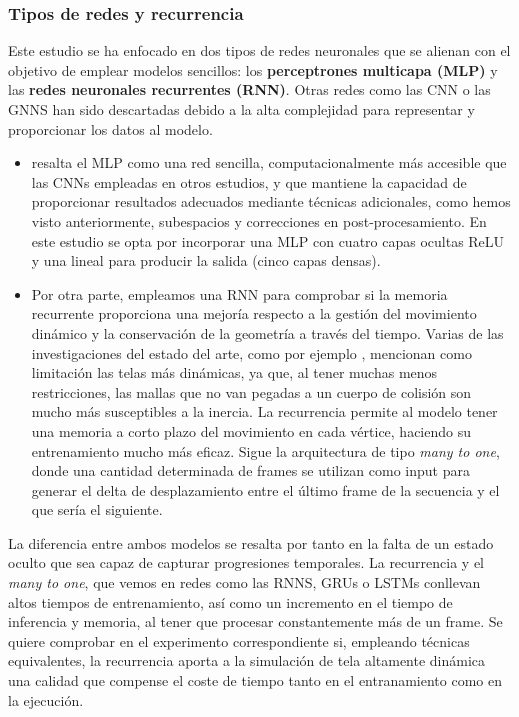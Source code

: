 \subsubsection{Tipos de redes y recurrencia}
Este estudio se ha enfocado en dos tipos de redes neuronales que se alienan con el objetivo de emplear modelos sencillos: los \textbf{perceptrones multicapa (MLP)} y las \textbf{redes neuronales recurrentes (RNN)}. Otras redes como las CNN o las GNNS han sido descartadas debido a la alta complejidad para representar y proporcionar los datos al modelo. 

\begin{itemize}
    \item \cite{holden_subspace_2019} resalta el MLP como una red sencilla, computacionalmente más accesible que las CNNs empleadas en otros estudios, y que mantiene la capacidad de proporcionar resultados adecuados mediante técnicas adicionales, como hemos visto anteriormente, subespacios y correcciones en post-procesamiento. En este estudio se opta por incorporar una MLP con cuatro capas ocultas ReLU y una lineal para producir la salida (cinco capas densas). %
    
    \item Por otra parte, empleamos una RNN para comprobar si la memoria recurrente proporciona una mejoría respecto a la gestión del movimiento dinámico y la conservación de la geometría a través del tiempo. Varias de las investigaciones del estado del arte, como por ejemplo \cite{santesteban2022snug}, mencionan como limitación las telas más dinámicas, ya que, al tener muchas menos restricciones, las mallas que no van pegadas a un cuerpo de colisión son mucho más susceptibles a la inercia. La recurrencia permite al modelo tener una memoria a corto plazo del movimiento en cada vértice, haciendo su entrenamiento mucho más eficaz. Sigue la arquitectura de tipo \textit{many to one}, donde una cantidad determinada de frames se utilizan como input para generar el delta de desplazamiento entre el último frame de la secuencia y el que sería el siguiente.
\end{itemize}

La diferencia entre ambos modelos se resalta por tanto en la falta de un estado oculto que sea capaz de capturar progresiones temporales. La recurrencia y el \textit{many to one}, que vemos en redes como las RNNS, GRUs o LSTMs conllevan altos tiempos de entrenamiento, así como un incremento en el tiempo de inferencia y memoria, al tener que procesar constantemente más de un frame. Se quiere comprobar en el experimento correspondiente si, empleando técnicas equivalentes, la recurrencia aporta a la simulación de tela altamente dinámica una calidad que compense el coste de tiempo tanto en el entranamiento como en la ejecución. \newline

